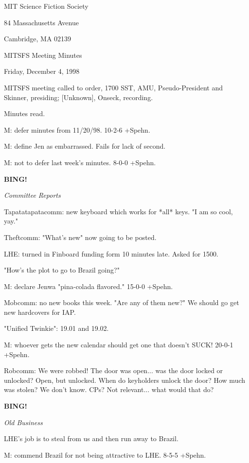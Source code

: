 \documentclass[12pt]{article}
\newcommand{\bing}{{\bf BING!} }
\newcommand{\goto}[1]{\bing \vskip 12pt \centerline{{\em{#1}}}}
\begin{document}
\begin{center}

MIT Science Fiction Society 

84 Massachusetts Avenue

Cambridge, MA 02139

\vspace{12pt}

MITSFS Meeting Minutes 

Friday, December 4, 1998

\end{center}
 
\vspace{18pt}

\setlength{\parskip}{6pt}

\noindent
MITSFS meeting called to order, 1700 SST,
AMU, Pseudo-President and Skinner, presiding; [Unknown], Onseck, recording.

Minutes read.

M: defer minutes from 11/20/98. 10-2-6 +Spehn.

M: define Jen as embarrassed. Fails for lack of second.

M: not to defer last week's minutes. 8-0-0 +Spehn.

\goto{Committee Reports}

Tapatatapatacomm: new keyboard which works for *all* keys. "I am so cool, yay."

Theftcomm: "What's new" now going to be posted.

LHE: turned in Finboard funding form 10 minutes late. Asked for 1500.

"How's the plot to go to Brazil going?"

M: declare Jenwa "pina-colada flavored." 15-0-0 +Spehn.

Mobcomm: no new books this week. "Are any of them new?" We should go get new hardcovers for IAP.

"Unified Twinkie": 19.01 and 19.02.

M: whoever gets the new calendar should get one that doesn't SUCK! 20-0-1 +Spehn.

Robcomm: We were robbed! The door was open... was the door locked or unlocked? Open, but unlocked. When do keyholders unlock the door? How much was stolen? We don't know. CPs? Not relevant... what would that do?

\goto{Old Business}

LHE's job is to steal from us and then run away to Brazil.

M: commend Brazil for not being attractive to LHE. 8-5-5 +Spehn.
\end{document}
